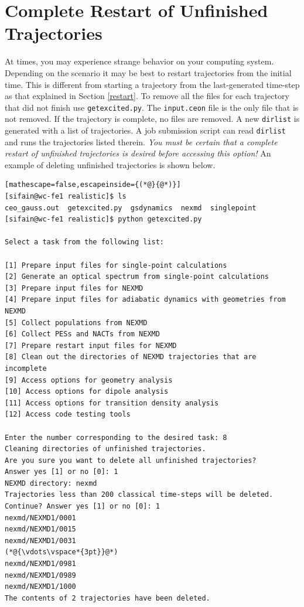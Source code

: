 \documentclass[letterpaper,12pt,titlepage]{article}
\begin{document}
\section{Complete Restart of Unfinished Trajectories}
At times, you may experience strange behavior on your computing system.  Depending on the scenario it may be best to restart trajectories from the initial time.  This is different from starting a trajectory from the last-generated time-step as that explained in Section \ref{restart}.  To remove all the files for each trajectory that did not finish use \verb+getexcited.py+.  The \verb+input.ceon+ file is the only file that is not removed.  If the trajectory is complete, no files are removed.  A new \verb+dirlist+ is generated with a list of trajectories.  A job submission script can read \verb+dirlist+ and runs the trajectories listed therein.  \textit{You must be certain that a complete restart of unfinished trajectories is desired before accessing this option!}  An example of deleting unfinished trajectories is shown below.
\begin{lstlisting}[mathescape=false,escapeinside={(*@}{@*)}]
[sifain@wc-fe1 realistic]$ ls
ceo_gauss.out  getexcited.py  gsdynamics  nexmd  singlepoint
[sifain@wc-fe1 realistic]$ python getexcited.py 

Select a task from the following list:

[1] Prepare input files for single-point calculations
[2] Generate an optical spectrum from single-point calculations
[3] Prepare input files for NEXMD
[4] Prepare input files for adiabatic dynamics with geometries from NEXMD
[5] Collect populations from NEXMD
[6] Collect PESs and NACTs from NEXMD
[7] Prepare restart input files for NEXMD
[8] Clean out the directories of NEXMD trajectories that are incomplete
[9] Access options for geometry analysis
[10] Access options for dipole analysis
[11] Access options for transition density analysis
[12] Access code testing tools

Enter the number corresponding to the desired task: 8
Cleaning directories of unfinished trajectories.
Are you sure you want to delete all unfinished trajectories?
Answer yes [1] or no [0]: 1
NEXMD directory: nexmd 
Trajectories less than 200 classical time-steps will be deleted.
Continue? Answer yes [1] or no [0]: 1
nexmd/NEXMD1/0001
nexmd/NEXMD1/0015
nexmd/NEXMD1/0031
(*@{\vdots\vspace*{3pt}}@*)
nexmd/NEXMD1/0981
nexmd/NEXMD1/0989
nexmd/NEXMD1/1000
The contents of 2 trajectories have been deleted.
\end{lstlisting}
\end{document}
